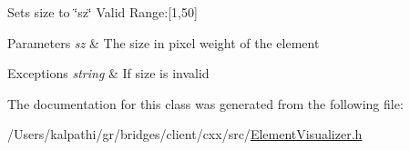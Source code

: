 Sets size to \char`\"{}sz\char`\"{} Valid Range\+:\mbox{[}1,50\mbox{]}


\begin{DoxyParams}{Parameters}
{\em sz} & The size in pixel weight of the element \\
\hline
\end{DoxyParams}

\begin{DoxyExceptions}{Exceptions}
{\em string} & If size is invalid \\
\hline
\end{DoxyExceptions}


The documentation for this class was generated from the following file\+:\begin{DoxyCompactItemize}
\item 
/\+Users/kalpathi/gr/bridges/client/cxx/src/\mbox{\hyperlink{_element_visualizer_8h}{Element\+Visualizer.\+h}}\end{DoxyCompactItemize}
